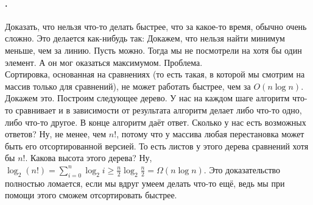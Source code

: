 \documentclass{article}
\begin{document}
    \paragraph{.}
    Доказать, что нельзя что-то делать быстрее, что за какое-то время, обычно очень сложно. Это делается как-нибудь так: Докажем, что нельзя найти минимум меньше, чем за линию. Пусть можно. Тогда мы не посмотрели на хотя бы один элемент. А он мог оказаться максимумом. Проблема.\\
    Сортировка, основанная на сравнениях (то есть такая, в которой мы смотрим на массив только для сравнений), не может работать быстрее, чем за $O(n\log n)$. Докажем это. Построим следующее дерево. У нас на каждом шаге алгоритм что-то сравнивает и в зависимости от результата алгоритм делает либо что-то одно, либо что-то другое. В конце алгоритм даёт ответ. Сколько у нас есть возможных ответов? Ну, не менее, чем $n!$, потому что у массива любая перестановка может быть его отсортированной версией. То есть листов у этого дерева сравнений хотя бы $n!$. Какова высота этого дерева? Ну, $\log_2(n!)=\sum\limits_{i=0}^n\log_2i\geqslant\frac n2\log_2\frac n2=\varOmega(n\log n)$. Это доказательство полностью ломается, если мы вдруг умеем делать что-то ещё, ведь мы при помощи этого сможем отсортировать быстрее.
\end{document}
